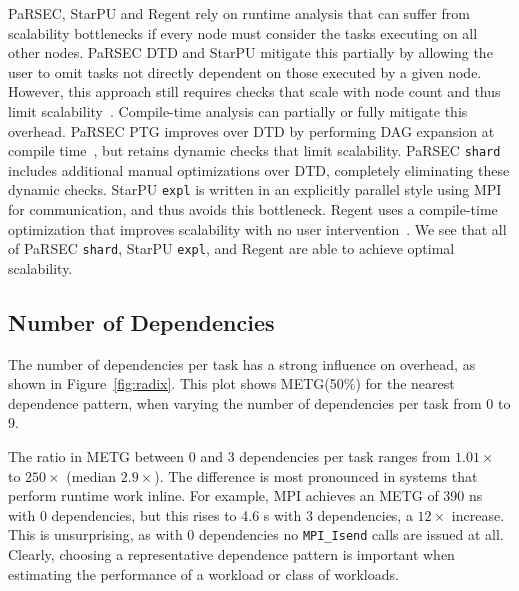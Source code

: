 PaRSEC, StarPU and Regent
rely on runtime analysis that can suffer from
scalability bottlenecks if every node must consider the tasks
executing on all other nodes. PaRSEC DTD and StarPU mitigate this
partially by allowing the user to omit tasks not directly
dependent on those executed by a given node. However, this approach still requires checks that scale with
node count and thus limit scalability~\cite{PARSEC_DTD}. Compile-time analysis can
partially or fully mitigate this overhead. PaRSEC PTG improves over DTD 
by performing DAG expansion at compile time~\cite{PARSEC_DTD}, but
retains dynamic checks that limit scalability. PaRSEC
\lstinline{shard} includes additional manual optimizations over DTD,
completely eliminating these dynamic checks. StarPU \lstinline{expl}
is written in an explicitly parallel style using MPI for
communication, and thus avoids this bottleneck. Regent uses a
compile-time optimization that improves scalability with no user
intervention~\cite{ControlReplication17}. We see that all of PaRSEC
\lstinline{shard}, StarPU \lstinline{expl}, and Regent are able to
achieve optimal scalability.

\subsection{Number of Dependencies}
\label{subsec:number-of-dependencies}

The number of dependencies per task has a strong influence on
overhead, as shown in
Figure~\ref{fig:radix}. This plot shows METG(50\%) for the nearest
dependence pattern, when varying the number of dependencies per task
from 0 to 9.



The ratio in METG between 0 and 3 dependencies per task ranges from
$1.01\times$ to $250\times$ (median $2.9\times$). The difference is most pronounced in systems that
perform runtime work inline. For example, MPI achieves an METG of 390
ns with 0 dependencies, but this rises to 4.6 \textmu{}s with 3 dependencies,
a $12\times$ increase. This is unsurprising, as with
0 dependencies no \lstinline[language=C++]{MPI_Isend} calls are
issued at all. Clearly, choosing a representative dependence
pattern is important when estimating the performance of a workload or
class of workloads.



